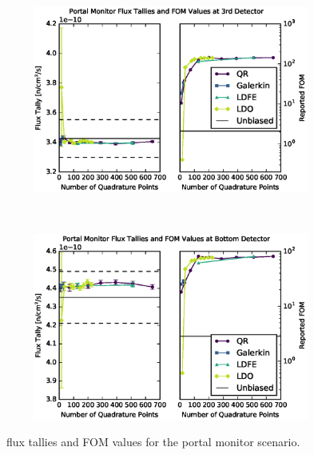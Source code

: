 \begin{figure}[!htb]
\ContinuedFloat
\begin{subfigure}{\textwidth}
\centering
\includegraphics[max height=0.445\textheight]
{img/cargo-plots/mcnp/fwc-34.eps}
\end{subfigure}
\\
\begin{subfigure}{\textwidth}
\centering
\includegraphics[max height=0.445\textheight]
{img/cargo-plots/mcnp/fwc-44.eps}
\label{cargo-fwc-14}
\end{subfigure}
\caption{\fwc\ flux tallies and FOM values for the portal monitor scenario.}
\label{cargo-fwc}
\end{figure}


